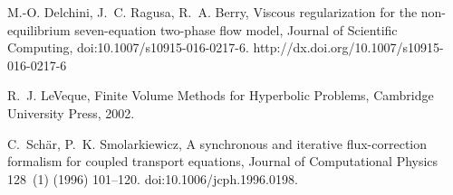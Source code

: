 \documentclass[xchauthor,chkrefs,fixeqskip,GCNS,amsmath,amsthm]{yjcphg}
\theoremstyle{remark}
\begin{document}
\begin{backmatter}
\begin{thebibliography}{}
\begin{bsubitem}
\begin{bcontribution}%
\end{bcontribution}
\begin{bhost}
\begin{bissue}
\end{bissue}
\end{bhost}
\end{bsubitem}
%
\OrigBibText
M.-O. Delchini, J.~C. Ragusa, R.~A. Berry, Viscous regularization for
the non-equilibrium seven-equation two-phase flow model, Journal of
Scientific
Computing, doi:10.1007/s10915-016-0217-6.
http://dx.doi.org/10.1007/s10915-016-0217-6
\endOrigBibText
{}%
\endbibitem

\begin{bsubitem}
\begin{bcontribution}%
\end{bcontribution}
\begin{bhost}
\begin{bbook}
\end{bbook}
\end{bhost}
\end{bsubitem}
%
\OrigBibText
R.~J. LeVeque, Finite Volume Methods for Hyperbolic Problems, Cambridge
University Press, 2002.
\endOrigBibText
{}%
\endbibitem

\begin{bsubitem}
\begin{bcontribution}%
\end{bcontribution}
\begin{bhost}
\begin{bissue}
\end{bissue}
\end{bhost}
\end{bsubitem}
%
\OrigBibText
C.~Sch\"ar, P.~K. Smolarkiewicz, A synchronous and iterative
flux-correction formalism for coupled transport equations, Journal of
Computational Physics 128~(1) (1996) 101--120.
\newblock doi:10.1006/jcph.1996.0198.
\endOrigBibText
{}%
\endbibitem


\end{thebibliography}
\end{backmatter}
\end{document}
